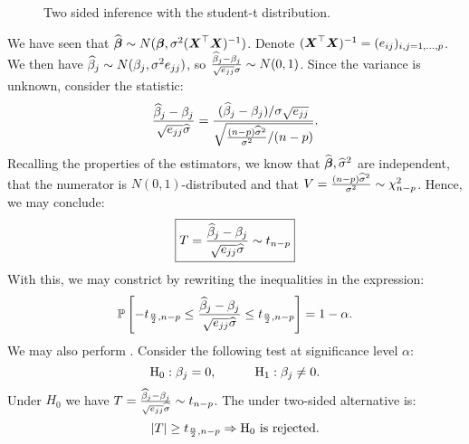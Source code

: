 \begin{figure}[H]
    \centering
    \caption{Two sided inference with the student-t distribution.}
\end{figure}

We have seen that $\widehat{\boldsymbol{\beta}}\sim N(\boldsymbol{\beta}, \sigma^2(\boldsymbol{X}^\top\boldsymbol{X})^{-1})$. Denote $(\boldsymbol{X}^\top\boldsymbol{X})^{-1}=(e_{ij})_{i,j=1,\dots,p}$. We then have $\widehat{\beta}_j\sim N(\beta_j, \sigma^2 e_{jj})$, so $\frac{\widehat{\beta}_j-\beta_j}{\sqrt{e_{jj}}\sigma}\sim N(0,1)$. Since the variance is unknown, consider the statistic:
$$
    \frac{\widehat{\beta}_j-\beta_j}{\sqrt{e_{jj}}\widehat{\sigma}}
    =
    \frac{(\widehat{\beta}_j-\beta_j)/\sigma\sqrt{e_{jj}}}{\sqrt{\frac{(n-p)\widehat{\sigma}^2}{\sigma^2} / (n-p)}}.
$$
Recalling the properties of the estimators, we know that $\widehat{\boldsymbol{\beta}}, \widehat{\sigma}^2$ are independent, that the numerator is $N(0,1)$-distributed and that $V=\frac{(n-p)\widehat{\sigma}^2}{\sigma^2}\sim \chi^2_{n-p}$. Hence, we may conclude:
\begin{equation}
    \boxed{T = \frac{\widehat{\beta}_j-\beta_j}{\sqrt{e_{jj}}\widehat{\sigma}} \sim t_{n-p}}
\end{equation}
With this, we may constrict  by rewriting the inequalities in the expression:
$$
    \mathbb{P}\left[-t_{\frac{\alpha}{2},n-p} \leq \frac{\widehat{\beta}_j-\beta_j}{\sqrt{e_{jj}}\widehat{\sigma}} \leq t_{\frac{\alpha}{2}, n-p}\right] = 1-\alpha.
$$
We may also perform . Consider the following test at significance level $\alpha$:
$$
    \mathrm{H}_0 : \beta_j = 0, 
    \quad\quad\quad
    \mathrm{H}_1 : \beta_j \ne 0.
$$
Under $H_0$ we have $T=\frac{\widehat{\beta}_j-\beta_j}{\sqrt{e_{jj}}\widehat{\sigma}} \sim t_{n-p}$. The  under two-sided alternative is:
$$
    \lvert T \rvert \geq t_{\frac{\alpha}{2}, n-p} \Rightarrow \mathrm{H}_0 \textrm{ is rejected}.
$$

